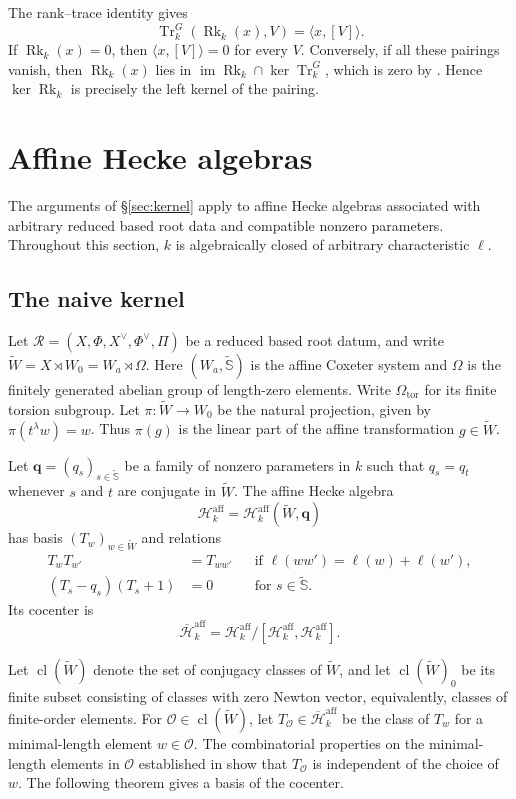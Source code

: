 \documentclass[11pt,letterpaper]{amsart}
\theoremstyle{definition}
\numberwithin{equation}{section}
\numberwithin{theorem}{section}
\newcommand{\kk}{k}
\newcommand{\cH}{\mathcal H}
\newcommand{\bH}{\overline{\mathcal H}}
\newcommand{\cO}{\mathcal O}
\newcommand{\Wt}{\tilde W}
\newcommand{\Waff}{W_a}
\newcommand{\Saff}{\widetilde{\mathbb S}}
\DeclareMathOperator{\Tr}{Tr}
\DeclareMathOperator{\Rk}{Rk}
\DeclareMathOperator{\im}{im}
\begin{document}
The rank--trace identity \cite[\S1.3]{Dat} gives
\[
 \Tr_\kk^G(\Rk_\kk(x),V)=\langle x,[V]\rangle.
\]
If $\Rk_\kk(x)=0$, then $\langle x,[V]\rangle=0$
for every $V$.
Conversely, if all these pairings vanish, then
$\Rk_\kk(x)$ lies in
$\im\Rk_\kk\cap\ker\Tr_\kk^G$, which is zero by
.
Hence $\ker\Rk_\kk$ is precisely the left kernel
of the pairing.

\section{Affine Hecke algebras}


\label{sec:affine}

The arguments of \S\ref{sec:kernel} apply to affine Hecke algebras
associated with arbitrary reduced based root data and
compatible nonzero parameters. Throughout this section, $\kk$ is algebraically closed of arbitrary characteristic $\ell$.

\subsection{The naive kernel}

Let
$\mathscr R=(X,\Phi,X^\vee,\Phi^\vee,\Pi)$ be a reduced
based root datum, and write $\Wt=X\rtimes W_0=\Waff\rtimes\Omega$.
Here $(\Waff,\Saff)$ is the affine Coxeter system and
$\Omega$ is the finitely generated abelian group of
length-zero elements. Write $\Omega_{\mathrm{tor}}$
for its finite torsion subgroup. Let $\pi:\Wt \to W_0$ be the natural
projection, given by $\pi(t^\lambda w)=w$.
Thus $\pi(g)$ is the linear part of the affine
transformation $g\in\Wt$.

Let $\mathbf q=(q_s)_{s\in\Saff}$ be a family of nonzero
parameters in $\kk$ such that $q_s=q_t$ whenever $s$ and $t$
are conjugate in $\Wt$. The affine Hecke algebra
\[
 \cH_\kk^{\mathrm{aff}}
   =\cH_\kk^{\mathrm{aff}}(\Wt,\mathbf q)
\]
has basis $(T_w)_{w\in\Wt}$ and relations
\[
 \begin{aligned}
 T_wT_{w'}&=T_{ww'}
   &&\text{if }\ell(ww')=\ell(w)+\ell(w'),\\
 (T_s-q_s)(T_s+1)&=0
   &&\text{for }s\in\Saff.
 \end{aligned}
\]
Its cocenter is
\[
 \bH_\kk^{\mathrm{aff}}
   =\cH_\kk^{\mathrm{aff}}/
      [\cH_\kk^{\mathrm{aff}},\cH_\kk^{\mathrm{aff}}].
\]

Let $\operatorname{cl}(\Wt)$ denote the set of conjugacy
classes of $\Wt$, and let $\operatorname{cl}(\Wt)_0$
be its finite subset consisting of classes with zero
Newton vector, equivalently, classes of finite-order
elements. For $\cO\in\operatorname{cl}(\Wt)$, let
$T_\cO\in\bH_\kk^{\mathrm{aff}}$ be the class of $T_w$
for a minimal-length element $w\in\cO$.
The combinatorial properties on the minimal-length elements in $\cO$ established in \cite{HN14} show that $T_\cO$ is independent of the choice of $w$. The following theorem gives a basis of the cocenter.
\end{document}
